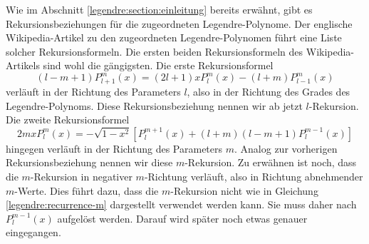 Wie im Abschnitt \ref{legendre:section:einleitung} bereits erwähnt, gibt es Rekursionsbeziehungen für die zugeordneten Legendre-Polynome.
%
Der englische Wikipedia-Artikel \cite{legendre:wikipedia} zu den zugeordneten Legendre-Polynomen führt eine Liste solcher Rekursionsformeln.
Die ersten beiden Rekursionsformeln des Wikipedia-Artikels sind wohl die gängigsten.
Die erste Rekursionsformel
\begin{equation}
(l-m+1)P^{m}_{l+1}(x)
=(2l+1)xP^{m}_{l}(x)
-(l+m)P^{m}_{l-1}(x)
\label{legendre:recurrence-l}
\end{equation}
verläuft in der Richtung des Parameters $l$, also in der Richtung des Grades des Legendre-Polynoms.
Diese Rekursionsbeziehung nennen wir ab jetzt $l$-Rekursion.
%
Die zweite Rekursionsformel
\begin{equation}
2mxP^{m}_{l}(x)
=-\sqrt{1-x^2}
\left[ P^{m+1}_{l}(x) + (l+m)(l-m+1)P^{m-1}_{l}(x) \right]
\label{legendre:recurrence-m}
\end{equation}
hingegen verläuft in der Richtung des Parameters $m$.
Analog zur vorherigen Rekursionsbeziehung nennen wir diese $m$-Rekursion.
%
Zu erwähnen ist noch, dass die $m$-Rekursion in negativer $m$-Richtung verläuft, also in Richtung abnehmender $m$-Werte.
Dies führt dazu, dass die $m$-Rekursion nicht wie in Gleichung \eqref{legendre:recurrence-m} dargestellt verwendet werden kann.
Sie muss daher nach $P^{m-1}_{l}(x)$ aufgelöst werden.
Darauf wird später noch etwas genauer eingegangen.

